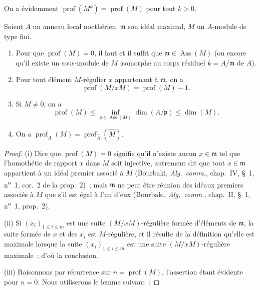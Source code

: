 On a évidemment $\operatorname{prof}(M^k)=\operatorname{prof}(M)$ pour tout
$k>0$.

\begin{proposition}[16.4.6]
Soient $A$ un anneau local noethérien, $\mathfrak{m}$ son idéal maximal, $M$ un
$A$-module de type fini.
\begin{enumerate}
  \item[\rm{(i)}] Pour que $\operatorname{prof}(M)=0$, il faut et il suffit que
  $\mathfrak{m}\in\operatorname{Ass}(M)$ \textup{(ou encore qu'il existe un sous-module
  de $M$ isomorphe au corps résiduel $k=A/\mathfrak{m}$ de $A$)}.
  \item[\rm{(ii)}] Pour tout élément $M$-régulier $x$ appartenant à
  $\mathfrak{m}$, on a
  \begin{equation}
  \label{0.16.4.6.1-fr}
  \tag{16.4.6.1}
    \operatorname{prof}(M/xM)=\operatorname{prof}(M)-1.
  \end{equation}
  \item[\rm{(iii)}] Si $M\neq0$, on a
  \begin{equation}
  \label{0.16.4.6.2-fr}
  \tag{16.4.6.2}
    \operatorname{prof}(M)
    \leq\inf_{\mathfrak{p}\in\operatorname{Ass}(M)}\dim(A/\mathfrak{p})
    \leq\dim(M).
  \end{equation}
  \item[\rm{(iv)}] On a
  $\operatorname{prof}_A(M)=
  \operatorname{prof}_{\widehat{A}}(\widehat{M})$.
\end{enumerate}
\end{proposition}

\begin{proof}
(i) Dire que $\operatorname{prof}(M)=0$ signifie qu'il n'existe aucun
$x\in\mathfrak{m}$ tel que l'homothétie de rapport $x$ dans $M$ soit
injective, autrement dit que tout $x\in\mathfrak{m}$ appartient à un idéal
premier associé à $M$ (Bourbaki, \emph{Alg.~comm.}, chap.~IV, \S~1, n\textsuperscript{o}~1,
cor.~2 de la prop.~2)~; mais $\mathfrak{m}$ ne peut être réunion des idéaux
premiers associés à $M$ que s'il est égal à l'un d'eux (Bourbaki,
\emph{Alg.~comm.}, chap.~II, \S~1, n\textsuperscript{o}~1, prop.~2).

(ii) Si $(x_i)_{1\leq i\leq m}$ est une suite $(M/xM)$-régulière formée
d'éléments de $\mathfrak{m}$, la suite formée de $x$ et des $x_i$ est
$M$-régulière, et il résulte de la définition qu'elle est maximale lorsque la
suite $(x_i)_{1\leq i\leq m}$ est une suite $(M/xM)$-régulière maximale~; d'où
la conclusion.

(iii) Raisonnons par récurrence sur $n=\operatorname{prof}(M)$, l'assertion
étant évidente pour $n=0$. Nous utiliserons le lemme suivant~:
\end{proof}


